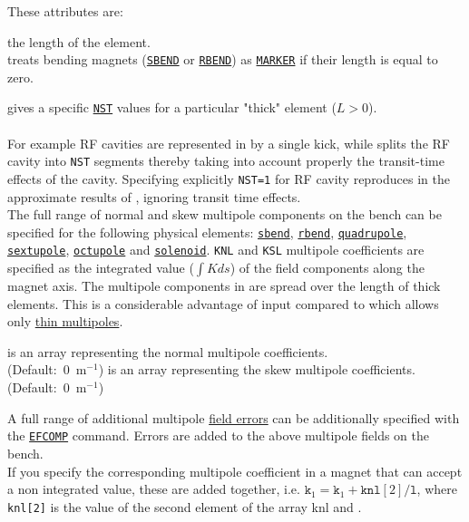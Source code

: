 These attributes are:
\begin{madlist}
   the length of the element. \\ \ptc treats bending magnets
  (\hyperref[sec:bend]{\texttt{SBEND}} or \hyperref[sec:bend]{\texttt{RBEND}})
  as \hyperref[sec:marker]{\texttt{MARKER}} if their length is equal to zero.

   gives a specific \hyperref[sec:ptc-twiss]{\texttt{NST}}
  values for a particular "thick" element ($L > 0$). \\
  \\
  For example RF cavities are represented in \madx
  by a single kick, while \ptc splits the RF cavity into
  \texttt{NST} segments thereby taking into account properly the
  transit-time effects of the cavity. Specifying explicitly \texttt{NST=1}
  for RF cavity reproduces in \ptc the approximate results of \madx,
  ignoring transit time effects.
  \\

   The full range of  normal and skew multipole
  components on the bench can be  specified for the following physical
  elements:
  \hyperref[sec:bend]{\texttt{sbend}},
  \hyperref[sec:bend]{\texttt{rbend}},
  \hyperref[sec:quadrupole]{\texttt{quadrupole}},
  \hyperref[sec:sextupole]{\texttt{sextupole}},
  \hyperref[sec:octupole]{\texttt{octupole}} and
  \hyperref[sec:solenoid]{\texttt{solenoid}}.
  \texttt{KNL} and \texttt{KSL} multipole coefficients are specified as the
  integrated value ($\int K ds$) of the field components along the
  magnet axis. The multipole components in \ptc are spread over
  the length of thick elements. This is a considerable
  advantage of \ptc input compared  to \madx  which allows only
  \hyperref[sec:multipole]{thin multipoles}.
  \begin{madlist}
     is an array representing the normal multipole
    coefficients. \\ (Default:~0~m$^{-1}$)
     is an array representing the skew multipole
    coefficients. \\ (Default:~0~m$^{-1}$)
  \end{madlist}

  A full range of additional multipole \hyperref[sec:efcomp]{field
    errors} can be additionally specified with the
  \hyperref[sec:efcomp]{\texttt{EFCOMP}} command. Errors are added to
  the above multipole fields on the bench.\\
  If you specify the corresponding multipole coefficient in a magnet that can accept 
  a non integrated value, these are added together, i.e. 
  $\texttt{k}_1 = \texttt{k}_1 + \texttt{knl}[2]/\texttt{l}$, 
  where \texttt{knl[2]} is the value of the second element of the array knl and .

\end{madlist}

